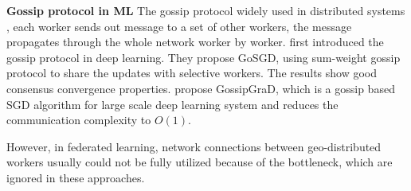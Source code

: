 \textbf{Gossip protocol in ML}
The gossip protocol widely used in distributed systems \cite{baraglia2013a,haas2002gossip-based}, each worker sends out message to a set of other workers, the message propagates through the whole network worker by worker. \cite{blot2016gossip} first introduced the gossip protocol in deep learning. They propose GoSGD, using sum-weight gossip protocol to share the updates with selective workers. The results show good consensus convergence properties. \cite{daily2018gossipgrad:} propose GossipGraD, which is a gossip based SGD algorithm for large scale deep learning system and reduces the communication complexity to $O(1)$. 

However, in federated learning, network connections between geo-distributed workers usually could not be fully utilized because of the bottleneck, which are ignored in these approaches. 

%
%



